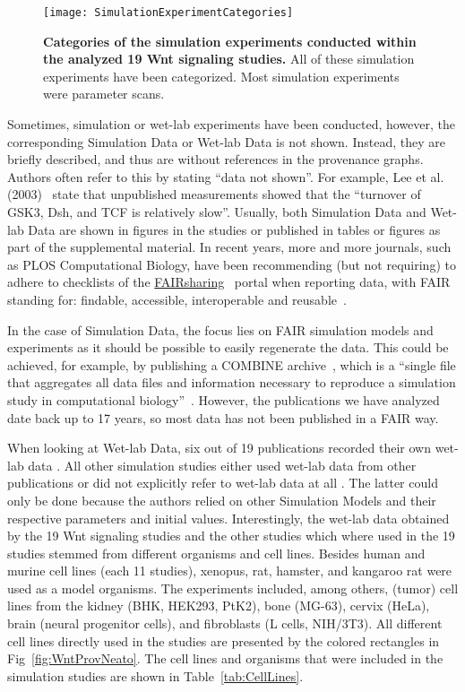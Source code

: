 \documentclass[10pt,letterpaper]{article}
\newcommand{\wnt}{Wnt}
\newcommand{\lee}{Lee et al. (2003)}
\newcommand{\SMs}{Simulation Models}
\newcommand{\SD}{Simulation Data}
\newcommand{\WD}{Wet-lab Data}
\begin{document}
\begin{figure}[!h]%
\centerline{\texttt{[image: SimulationExperimentCategories]}}
\caption{{\bf Categories of the simulation experiments conducted within the analyzed 19 \wnt{} signaling studies.}
All of these simulation experiments have been categorized.
Most simulation experiments were parameter scans.}
\label{fig:SEcategories}
\end{figure}


Sometimes, simulation or wet-lab experiments have been conducted, however, the corresponding \SD{} or \WD{} is not shown. Instead, they are briefly described, and thus are without references in the provenance graphs.
Authors often refer to this by stating \enquote{data not shown}.
For example, \lee{}~\cite{Lee2003} state that unpublished measurements showed that the \enquote{turnover of GSK3\textbeta{}, Dsh, and TCF is relatively slow}.
Usually, both \SD{} and \WD{} are shown in figures in the studies or published in tables or figures as part of the supplemental material.
In recent years, more and more journals, such as PLOS Computational Biology, have been recommending (but not requiring) to adhere to checklists of the \href{https://fairsharing.org/}{FAIRsharing}~\cite{Sansone2019} portal when reporting data, with FAIR standing for: findable, accessible, interoperable and reusable~\cite{Wilkinson2016}.

In the case of \SD{}, the focus lies on FAIR simulation models and experiments as it should be possible to easily regenerate the data.
This could be achieved, for example, by publishing a COMBINE archive~\cite{Bergmann2014}, which is a \enquote{single file that aggregates all data files and information necessary to reproduce a simulation study in computational biology}~\cite{Scharm2016b}.
However, the publications we have analyzed date back up to 17 years, so most data has not been published in a FAIR way.

When looking at \WD{}, six out of 19 publications recorded their own wet-lab data \cite{Lee2003, Sick2006, Kim2007, Kogan2012, Haack2015, Staehlke2020}.
All other simulation studies either used wet-lab data from other publications or did not explicitly refer to wet-lab data at all \cite{Kruger2004, Cho2006, Rodriguez2007, vanLeeuwen2007, vanLeeuwen2009, Mirams2010, Padala2017}.
The latter could only be done because the authors relied on other \SMs{} and their respective parameters and initial values.
Interestingly, the wet-lab data obtained by the 19 \wnt{} signaling studies and the other studies which where used in the 19 studies stemmed from different organisms and cell lines.
Besides human and murine cell lines (each 11 studies), xenopus, rat, hamster, and kangaroo rat were used as a model organisms.
The experiments included, among others, (tumor) cell lines from the kidney (BHK, HEK293, PtK2), bone (MG-63), cervix (HeLa), brain (neural progenitor cells), and fibroblasts (L cells, NIH/3T3).
All different cell lines directly used in the studies are presented by the colored rectangles in Fig~\ref{fig:WntProvNeato}.
The cell lines and organisms that were included in the simulation studies are shown in Table~\ref{tab:CellLines}.
\end{document}
